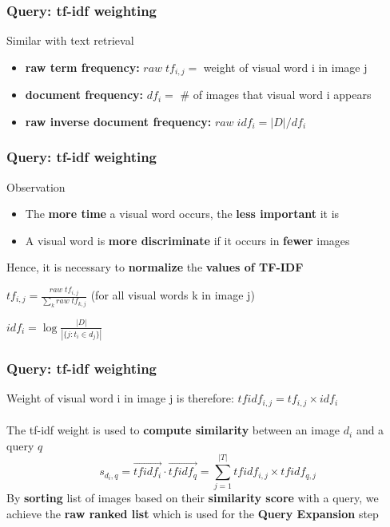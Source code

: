 \begin{frame}
	\frametitle{Query: tf-idf weighting}
	Similar with text retrieval
	\begin{itemize}
		\item \textbf{raw term frequency:} $raw\;tf_{i,j} =$ weight of visual word i in image j
		\item \textbf{document frequency:} $df_i =$ \# of images that visual word i appears
		\item \textbf{raw inverse document frequency:} $raw\;idf_i = |D|/df_i$
	\end{itemize}	
\end{frame}

\begin{frame}
	\frametitle{Query: tf-idf weighting}
	Observation
	\begin{itemize}
		\item The \textbf{more time} a visual word occurs, the \textbf{less important} it is
		\item A visual word is \textbf{more discriminate} if it occurs in \textbf{fewer} images
	\end{itemize}
	Hence, it is necessary to \textbf{normalize} the \textbf{values of TF-IDF}
	
	\hspace{4ex}$tf_{i,j} =  \frac{raw\;tf_{i,j}}{\sum\limits_{k}raw\;tf_{k,j}}$ (for all visual words k in image j)
	
	\hspace{4ex}$idf_{i} = \log{\frac{|D|}{|\{j:t_{i}\in d_{j}\}|}}$
\end{frame}

\begin{frame}
	\frametitle{Query: tf-idf weighting}
	Weight of visual word i in image j is therefore: $tfidf_{i,j} = tf_{i,j}\times idf_{i}$\\\\
	The tf-idf weight is used to \textbf{compute similarity} between an image $d_{i}$ and a query $q$
	\begin{equation*}
		s_{d_{i},q} = \vec{{tfidf}_{i}} \cdot \vec{{tfidf}_{q}} = \sum\limits_{j = 1}^{\left|T\right|} {tfidf}_{i, j} \times {tfidf}_{q, j}
	\end{equation*}
	By \textbf{sorting} list of images based on their \textbf{similarity score} with a query, we achieve the \textbf{raw ranked list} which is used for the \textbf{Query Expansion} step
\end{frame}

